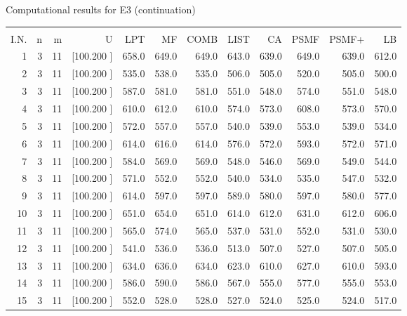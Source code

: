 \documentclass[12pt,a4paper]{article}
\begin{document}
\newpage
\begin{center}
 Computational results for E3 (continuation) {\tiny
\begin{tabular}{r r r r r r r r r r r r}\hline
    &   &   &          &        &        &        &        &        &        &        &       \\[-0.1in]
  I.N.  &  n  &  m  &  U  &  LPT  &  MF  &  COMB  &  LIST  &  CA  & PSMF &PSMF+ & LB \\[0.03in]
\hline
   1&  3& 11&[100.200   ]&   658.0&   649.0&   649.0&   643.0&   639.0&   649.0&   639.0&   612.0\\[-0.02in]
   2&  3& 11&[100.200   ]&   535.0&   538.0&   535.0&   506.0&   505.0&   520.0&   505.0&   500.0\\[-0.02in]
   3&  3& 11&[100.200   ]&   587.0&   581.0&   581.0&   551.0&   548.0&   574.0&   551.0&   548.0\\[-0.02in]
   4&  3& 11&[100.200   ]&   610.0&   612.0&   610.0&   574.0&   573.0&   608.0&   573.0&   570.0\\[-0.02in]
   5&  3& 11&[100.200   ]&   572.0&   557.0&   557.0&   540.0&   539.0&   553.0&   539.0&   534.0\\[-0.02in]
   6&  3& 11&[100.200   ]&   614.0&   616.0&   614.0&   576.0&   572.0&   593.0&   572.0&   571.0\\[-0.02in]
   7&  3& 11&[100.200   ]&   584.0&   569.0&   569.0&   548.0&   546.0&   569.0&   549.0&   544.0\\[-0.02in]
   8&  3& 11&[100.200   ]&   571.0&   552.0&   552.0&   540.0&   534.0&   535.0&   547.0&   532.0\\[-0.02in]
   9&  3& 11&[100.200   ]&   614.0&   597.0&   597.0&   589.0&   580.0&   597.0&   580.0&   577.0\\[-0.02in]
  10&  3& 11&[100.200   ]&   651.0&   654.0&   651.0&   614.0&   612.0&   631.0&   612.0&   606.0\\[-0.02in]
  11&  3& 11&[100.200   ]&   565.0&   574.0&   565.0&   537.0&   531.0&   552.0&   531.0&   530.0\\[-0.02in]
  12&  3& 11&[100.200   ]&   541.0&   536.0&   536.0&   513.0&   507.0&   527.0&   507.0&   505.0\\[-0.02in]
  13&  3& 11&[100.200   ]&   634.0&   636.0&   634.0&   623.0&   610.0&   627.0&   610.0&   593.0\\[-0.02in]
  14&  3& 11&[100.200   ]&   586.0&   590.0&   586.0&   567.0&   555.0&   577.0&   555.0&   553.0\\[-0.02in]
  15&  3& 11&[100.200   ]&   552.0&   528.0&   528.0&   527.0&   524.0&   525.0&   524.0&   517.0\\[-0.02in]

\end{tabular}}
\end{center}
\end{document}
